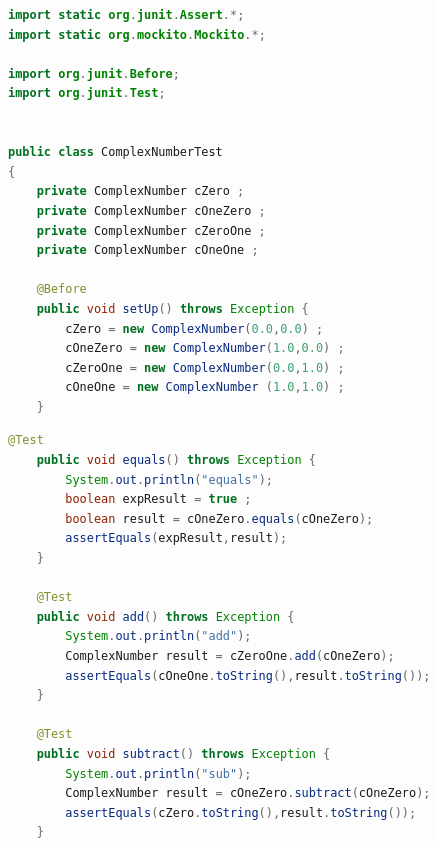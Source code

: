\documentclass[11pt, xcolor=svgnames]{beamer}
\begin{document}

\begin{frame}[fragile]
\begin{lstlisting}[language=JAVA,basicstyle=\tiny]
import static org.junit.Assert.*;
import static org.mockito.Mockito.*;

import org.junit.Before;
import org.junit.Test;


public class ComplexNumberTest
{
	private ComplexNumber cZero ;
	private ComplexNumber cOneZero ;
	private ComplexNumber cZeroOne ;
	private ComplexNumber cOneOne ;
	
	@Before
	public void setUp() throws Exception {
		cZero = new ComplexNumber(0.0,0.0) ;
		cOneZero = new ComplexNumber(1.0,0.0) ;
		cZeroOne = new ComplexNumber(0.0,1.0) ;
		cOneOne = new ComplexNumber (1.0,1.0) ;
	}
\end{lstlisting}
\end{frame}


\begin{frame}[fragile]

\begin{lstlisting}[language=Java,basicstyle=\tiny]
	@Test
	public void equals() throws Exception {
		System.out.println("equals");
		boolean expResult = true ;
		boolean result = cOneZero.equals(cOneZero);
		assertEquals(expResult,result);
	}

	@Test
	public void add() throws Exception {
		System.out.println("add");
		ComplexNumber result = cZeroOne.add(cOneZero);
		assertEquals(cOneOne.toString(),result.toString());
	}

	@Test
	public void subtract() throws Exception	{
		System.out.println("sub");
		ComplexNumber result = cOneZero.subtract(cOneZero);
		assertEquals(cZero.toString(),result.toString());
	}
\end{lstlisting}

\end{frame}

\end{document}

